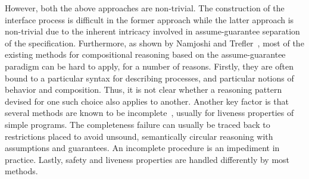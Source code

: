 \noindent
However, both the above approaches are non-trivial. The
construction of the interface process is difficult in the former approach while
the latter approach is non-trivial due to the inherent intricacy involved
in assume-guarantee separation of the specification. 
Furthermore, as shown by Namjoshi and Trefler~\cite{namjoshi},
most of the existing methods for compositional reasoning based on
the assume-guarantee paradigm can be hard to apply, for a number of
reasons. Firstly, they are often bound to a particular syntax for
describing processes, and particular notions of behavior and composition.
Thus, it is not clear whether a reasoning pattern devised for one such
choice also applies to another. Another key factor is that several
methods are known to be incomplete~\cite{namjoshi}, usually for liveness
properties of simple programs. The completeness failure can usually be traced
back to restrictions placed to avoid unsound, semantically circular
reasoning with assumptions and guarantees. An incomplete procedure is
an impediment in practice. Lastly, safety and liveness properties are
handled differently by most methods.

